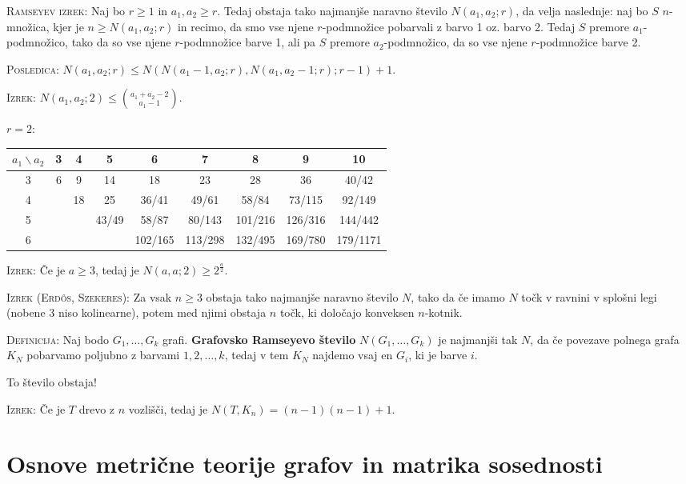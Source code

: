 \documentclass[8pt,a4paper]{amsart}
\theoremstyle{definition} %
\theoremstyle{plain} %
\begin{document}
\textsc{Ramseyev izrek:} Naj bo $r \geq 1$ in $a_1, a_2 \geq r$. Tedaj obstaja
tako najmanjše naravno število $N(a_1,a_2;r)$, da velja naslednje: naj bo $S$
$n$-množica, kjer je $n \geq N(a_1,a_2;r)$ in recimo, da smo vse njene
$r$-podmnožice pobarvali z barvo 1 oz. barvo 2. Tedaj $S$ premore
$a_1$-podmnožico, tako da so vse njene $r$-podmnožice barve 1, ali pa $S$
premore $a_2$-podmnožico, da so vse njene $r$-podmnožice barve 2.

\textsc{Posledica:} $N(a_1,a_2;r)\leq N(N(a_1-1,a_2;r),N(a_1,a_2-1;r);r-1)+1$.

\textsc{Izrek:} $N(a_1,a_2;2) \leq \binom{a_1+a_2-2}{a_1-1}$.

$r=2$:
\begin{tabular}{|c||c|c|c|c|c|c|c|c|} \hline
$a_1 \backslash a_2$ & 3 & 4 & 5 & 6 & 7 & 8 & 9 & 10 \\ \hline \hline
3 & 6 & 9 & 14 & 18 & 23 & 28 & 36 & 40/42 \\ \hline
4 &   & 18 & 25 & 36/41 & 49/61 & 58/84 & 73/115 & 92/149 \\ \hline
5 & & & 43/49 & 58/87 & 80/143 & 101/216 & 126/316 & 144/442 \\ \hline
6 & & & & 102/165 & 113/298 & 132/495 & 169/780 & 179/1171 \\ \hline

\end{tabular}

\textsc{Izrek:} Če je $a \geq 3$, tedaj je $N(a,a;2) \geq 2^{\frac{a}{2}}$.

\textsc{Izrek (Erdős, Szekeres):} Za vsak $n \geq 3$ obstaja tako najmanjše
naravno število $N$, tako da če imamo $N$ točk v ravnini v splošni legi (nobene
3 niso kolinearne), potem med njimi obstaja $n$ točk, ki določajo konveksen
$n$-kotnik.

\textsc{Definicija:} Naj bodo $G_1,\ldots ,G_k$ grafi. \textbf{Grafovsko
Ramseyevo število} $N(G_1,\ldots ,G_k)$ je najmanjši tak $N$, da če povezave
polnega grafa $K_N$ pobarvamo poljubno z barvami $1, 2, \ldots ,k$, tedaj v tem
$K_N$ najdemo vsaj en $G_i$, ki je barve $i$.

To število obstaja!

\textsc{Izrek:} Če je $T$ drevo z $n$ vozlišči, tedaj je $N(T,K_n) = (n-1)(n-1)+1$.

\vspace{-2ex}
\section{Osnove metrične teorije grafov in matrika sosednosti}
\end{document}
